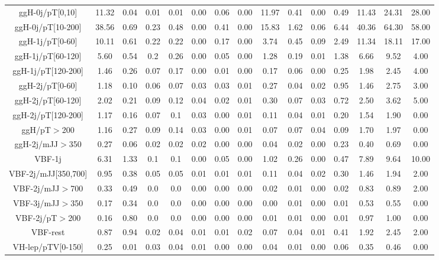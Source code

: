 \begin{table}[htb]
\begin{center}
{\begin{tabular}{cccccccc|cccc|cc|c}
				
				ggH-0j/pT[0,10] & 11.32 & 0.04 & 0.01 & 0.01 & 0.00 & 0.06 & 0.00 & 11.97 & 0.41 & 0.00 & 0.49 & 11.43 & 24.31 & 28.00
\\
ggH-0j/pT[10-200] & 38.56 & 0.69 & 0.23 & 0.48 & 0.00 & 0.41 & 0.00 & 15.83 & 1.62 & 0.06 & 6.44 & 40.36 & 64.30 & 58.00
\\
ggH-1j/pT[0-60] & 10.11 & 0.61 & 0.22 & 0.22 & 0.00 & 0.17 & 0.00 & 3.74 & 0.45 & 0.09 & 2.49 & 11.34 & 18.11 & 17.00
\\
ggH-1j/pT[60-120] & 5.60 & 0.54 & 0.2 & 0.26 & 0.00 & 0.05 & 0.00 & 1.28 & 0.19 & 0.01 & 1.38 & 6.66 & 9.52 & 4.00
\\
ggH-1j/pT[120-200] & 1.46 & 0.26 & 0.07 & 0.17 & 0.00 & 0.01 & 0.00 & 0.17 & 0.06 & 0.00 & 0.25 & 1.98 & 2.45 & 4.00
\\
ggH-2j/pT[0-60] & 1.18 & 0.10 & 0.06 & 0.07 & 0.03 & 0.03 & 0.01 & 0.27 & 0.04 & 0.02 & 0.95 & 1.46 & 2.75 & 3.00
\\
ggH-2j/pT[60-120] & 2.02 & 0.21 & 0.09 & 0.12 & 0.04 & 0.02 & 0.01 & 0.30 & 0.07 & 0.03 & 0.72 & 2.50 & 3.62 & 5.00
\\
ggH-2j/pT[120-200] & 1.17 & 0.16 & 0.07 & 0.1 & 0.03 & 0.00 & 0.01 & 0.11 & 0.04 & 0.01 & 0.20 & 1.54 & 1.90 & 0.00
\\
ggH/pT$>$200 & 1.16 & 0.27 & 0.09 & 0.14 & 0.03 & 0.00 & 0.01 & 0.07 & 0.07 & 0.04 & 0.09 & 1.70 & 1.97 & 0.00
\\
ggH-2j/mJJ$>$350 & 0.27 & 0.06 & 0.02 & 0.02 & 0.02 & 0.00 & 0.00 & 0.04 & 0.02 & 0.00 & 0.23 & 0.40 & 0.69 & 0.00
\\
VBF-1j & 6.31 & 1.33 & 0.1 & 0.1 & 0.00 & 0.05 & 0.00 & 1.02 & 0.26 & 0.00 & 0.47 & 7.89 & 9.64 & 10.00
\\
VBF-2j/mJJ[350,700] & 0.95 & 0.38 & 0.05 & 0.05 & 0.01 & 0.01 & 0.01 & 0.11 & 0.04 & 0.02 & 0.30 & 1.46 & 1.94 & 2.00
\\
VBF-2j/mJJ$>$700 & 0.33 & 0.49 & 0.0 & 0.0 & 0.00 & 0.00 & 0.00 & 0.02 & 0.01 & 0.00 & 0.02 & 0.83 & 0.89 & 2.00
\\
VBF-3j/mJJ$>$350 & 0.17 & 0.34 & 0.0 & 0.0 & 0.00 & 0.00 & 0.00 & 0.00 & 0.01 & 0.00 & 0.01 & 0.53 & 0.55 & 0.00
\\
VBF-2j/pT$>$200 & 0.16 & 0.80 & 0.0 & 0.0 & 0.00 & 0.00 & 0.00 & 0.01 & 0.01 & 0.00 & 0.01 & 0.97 & 1.00 & 0.00
\\
VBF-rest & 0.87 & 0.94 & 0.02 & 0.04 & 0.01 & 0.01 & 0.02 & 0.07 & 0.04 & 0.01 & 0.41 & 1.92 & 2.45 & 2.00
\\
VH-lep/pTV[0-150] & 0.25 & 0.01 & 0.03 & 0.04 & 0.01 & 0.00 & 0.00 & 0.04 & 0.01 & 0.00 & 0.06 & 0.35 & 0.46 & 0.00

\end{tabular}}
\end{center}
\end{table}
